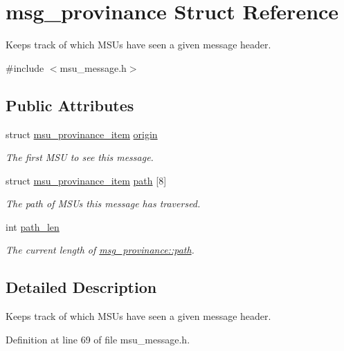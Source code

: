 \hypertarget{structmsg__provinance}{\section{msg\-\_\-provinance Struct Reference}
\label{structmsg__provinance}
}


Keeps track of which M\-S\-Us have seen a given message header.  




{\ttfamily \#include $<$msu\-\_\-message.\-h$>$}

\subsection*{Public Attributes}
\begin{DoxyCompactItemize}
\item 
struct \hyperlink{structmsu__provinance__item}{msu\-\_\-provinance\-\_\-item} \hyperlink{structmsg__provinance_a974d9fb93121e018c61b38d884b11976}{origin}
\begin{DoxyCompactList}\small\item\em The first M\-S\-U to see this message. \end{DoxyCompactList}\item 
struct \hyperlink{structmsu__provinance__item}{msu\-\_\-provinance\-\_\-item} \hyperlink{structmsg__provinance_a34afbc25ce0a338c85a16c9c2cc313db}{path} \mbox{[}8\mbox{]}
\begin{DoxyCompactList}\small\item\em The path of M\-S\-Us this message has traversed. \end{DoxyCompactList}\item 
int \hyperlink{structmsg__provinance_af76b2286a3dd70ce44114aff1b3684a0}{path\-\_\-len}
\begin{DoxyCompactList}\small\item\em The current length of \hyperlink{structmsg__provinance_a34afbc25ce0a338c85a16c9c2cc313db}{msg\-\_\-provinance\-::path}. \end{DoxyCompactList}\end{DoxyCompactItemize}


\subsection{Detailed Description}
Keeps track of which M\-S\-Us have seen a given message header. 

Definition at line 69 of file msu\-\_\-message.\-h.



